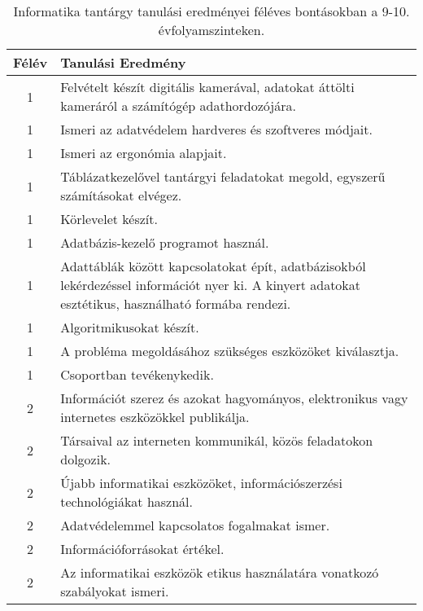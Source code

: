        
           \begin{longtable}{c | p{12cm} }
            \caption[Informatika 9-10.]{Informatika tantárgy tanulási eredményei féléves bontásokban a 9-10. évfolyamszinteken. }  \\

            \textbf{Félév} & \textbf{Tanulási Eredmény} \\
            \hline
            \endhead
                                
                                          1 &  Felvételt készít digitális kamerával, adatokat áttölti kameráról a számítógép adathordozójára. \\ \hline
                                          1 &  Ismeri az adatvédelem hardveres és szoftveres módjait. \\ \hline
                                          1 &  Ismeri az ergonómia alapjait. \\ \hline
                                          1 &  Táblázatkezelővel tantárgyi feladatokat megold, egyszerű számításokat elvégez. \\ \hline
                                          1 &  Körlevelet készít. \\ \hline
                                          1 &  Adatbázis-kezelő programot használ. \\ \hline
                                          1 &  Adattáblák között kapcsolatokat épít, adatbázisokból lekérdezéssel információt nyer ki. A kinyert adatokat esztétikus, használható formába rendezi. \\ \hline
                                          1 &  Algoritmikusokat készít. \\ \hline
                                          1 &  A probléma megoldásához szükséges eszközöket kiválasztja. \\ \hline
                                          1 &  Csoportban tevékenykedik. \\ \hline
                                      
                                
                                          2 &  Információt szerez és azokat hagyományos, elektronikus vagy internetes eszközökkel publikálja. \\ \hline
                                          2 &  Társaival az interneten kommunikál, közös feladatokon dolgozik. \\ \hline
                                          2 &  Újabb informatikai eszközöket, információszerzési technológiákat használ. \\ \hline
                                          2 &  Adatvédelemmel kapcsolatos fogalmakat ismer. \\ \hline
                                          2 &  Információforrásokat értékel. \\ \hline
                                          2 &  Az informatikai eszközök etikus használatára vonatkozó szabályokat ismeri. \\ \hline
                                      

\end{longtable}
